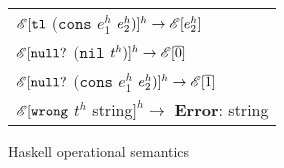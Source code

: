 \begin{figure}[p]
\begin{tabular}{l}

$\mathscr{E}[\mathtt{tl}$ $(\mathtt{cons}$ $e^h_1$ $e^h_2)]^h\rightarrow\mathscr{E}[e^h_2]$ \\


$\mathscr{E}[\mathtt{null?}$ $(\mathtt{nil}$ $t^h)]^h\rightarrow\mathscr{E}[\overline{0}]$ \\


$\mathscr{E}[\mathtt{null?}$ $(\mathtt{cons}$ $e^h_1$ $e^h_2)]^h\rightarrow\mathscr{E}[\overline{1}]$ \\


$\mathscr{E}[\mathtt{wrong}$ $t^h$ string$]^h\rightarrow$ \textbf{Error}: string

\end{tabular}
\caption{Haskell operational semantics}
\label{hos}
\end{figure}
